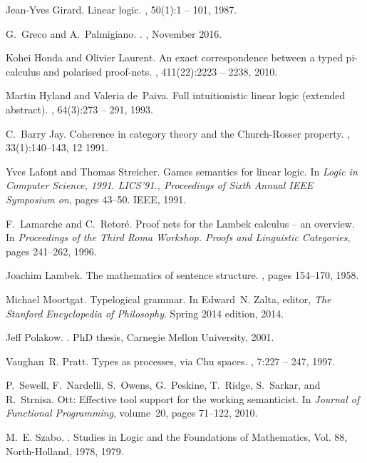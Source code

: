 \documentclass{llncs}
\begin{document}
\begin{thebibliography}{10}
Jean-Yves Girard.
\newblock Linear logic.
, 50(1):1 -- 101, 1987.

G.~{Greco} and A.~{Palmigiano}.
.
, November 2016.

Kohei Honda and Olivier Laurent.
\newblock An exact correspondence between a typed pi-calculus and polarised
  proof-nets.
, 411(22):2223 -- 2238, 2010.

Martin Hyland and Valeria de~Paiva.
\newblock Full intuitionistic linear logic (extended abstract).
, 64(3):273 -- 291, 1993.

C.~Barry Jay.
\newblock Coherence in category theory and the {C}hurch-{R}osser property.
, 33(1):140--143, 12 1991.

Yves Lafont and Thomas Streicher.
\newblock Games semantics for linear logic.
\newblock In {\em Logic in Computer Science, 1991. LICS'91., Proceedings of
  Sixth Annual IEEE Symposium on}, pages 43--50. IEEE, 1991.

F.~Lamarche and C.~Retor{\'e}.
\newblock Proof nets for the {L}ambek calculus -- an overview.
\newblock In {\em Proceedings of the Third Roma Workshop. Proofs and Linguistic
  Categories}, pages 241--262, 1996.

Joachim Lambek.
\newblock The mathematics of sentence structure.
, pages 154--170, 1958.

Michael Moortgat.
\newblock Typelogical grammar.
\newblock In Edward~N. Zalta, editor, {\em The Stanford Encyclopedia of
  Philosophy}. Spring 2014 edition, 2014.

Jeff Polakow.
.
\newblock PhD thesis, Carnegie Mellon University, 2001.

Vaughan~R. Pratt.
\newblock Types as processes, via {C}hu spaces.
, 7:227 -- 247,
  1997.

P.~Sewell, F.~Nardelli, S.~Owens, G.~Peskine, T.~Ridge, S.~Sarkar, and
  R.~Strnisa.
\newblock Ott: Effective tool support for the working semanticist.
\newblock In {\em Journal of Functional Programming}, volume~20, pages 71--122,
  2010.

M.~E. Szabo.
.
\newblock Studies in Logic and the Foundations of Mathematics, Vol. 88,
  North-Holland, 1978, 1979.

\end{thebibliography}

\end{document}
